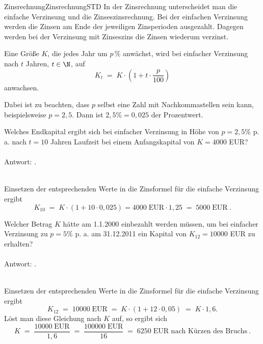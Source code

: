 \begin{MXContent}{Zinsrechnung}{Zinsrechnung}{STD}
In der Zinsrechnung unterscheidet man die einfache Verzinsung und die Zinseszinsrechnung.
Bei der einfachen Verzinsung werden die Zinsen am Ende der jeweiligen Zinsperioden ausgezahlt.
Dagegen werden bei der Verzinsung mit Zinseszins die Zinsen wiederum verzinst.

\begin{MInfo}
Eine Größe $K$, die jedes Jahr um $p\,\%$ anwächst, wird bei einfacher Verzinsung nach $t$ Jahren, $t\in \N$, auf
$$
K_{t}\; =\; K\cdot \left({ 1+ t\cdot \frac{p}{100}}\right)
$$
anwachsen.
\end{MInfo}

Dabei ist zu beachten, dass $p$ selbst eine Zahl mit Nachkommastellen sein kann, beispielsweise $p=2,5$. Dann ist $2,5\%=0,025$ der Prozentwert.

\begin{MExercise}
Welches Endkapital ergibt sich bei einfacher Verzinsung in Höhe von $p=2,5\%$ p. a. nach $t=10$ Jahren Laufzeit bei einem Anfangskapital von $K=4000$ EUR?
\ \\ \ \\
Antwort: .
\ \\ \ \\
\begin{MHint}{\iSolution}
Einsetzen der entsprechenden Werte in die Zinsformel für die einfache Verzinsung ergibt
$$
K_{10}\; =\; K\cdot \left({ 1 + 10\cdot 0,025}\right) =4000\; \text{EUR} \cdot 1,25\; =\; 5000\;\text{EUR}\: .
$$
\end{MHint}
\end{MExercise}

\begin{MExercise}
Welcher Betrag $K$ hätte am 1.1.2000 einbezahlt werden müssen, um bei einfacher Verzinsung zu $p=5\%$ p. a. am 31.12.2011 ein Kapital von $K_{12}=10000$ EUR zu erhalten?
\ \\ \ \\
Antwort: .
\ \\ \ \\
\begin{MHint}{\iSolution}
Einsetzen der entsprechenden Werte in die Zinsformel für die einfache Verzinsung ergibt
$$
K_{12}\; =\; 10000\;\text{EUR}\;  = \; K\cdot \left({1+12\cdot 0,05}\right)\; =\; K\cdot 1,6.
$$
Löst man diese Gleichung nach $K$ auf, so ergibt sich
$$
K\; =\; \frac{10000\; \text{EUR}}{1,6}\;  =\; \frac{100000\;\text{EUR}}{16}\;=\;  6250\;\text{EUR nach Kürzen des Bruchs}\: .
$$
\end{MHint}
\end{MExercise}


\end{MXContent}
